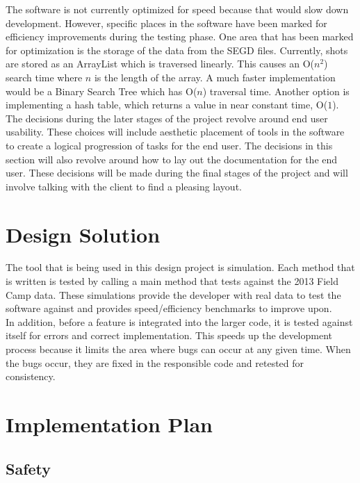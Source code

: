 \documentclass[12pt]{article}
\begin{document}
The software is not currently optimized for speed because that would slow down development. However, specific places in the software have been marked for efficiency improvements during the testing phase. One area that has been marked for optimization is the storage of the data from the SEGD files. Currently, shots are stored as an ArrayList which is traversed linearly. This causes an O($n^2$) search time where $n$ is the length of the array. A much faster implementation would be a Binary Search Tree which has O($n$) traversal time. Another option is implementing a hash table, which returns a value in near constant time, O($1$). \\

The decisions during the later stages of the project revolve around end user usability. These choices will include aesthetic placement of tools in the software to create a logical progression of tasks for the end user. The decisions in this section will also revolve around how to lay out the documentation for the end user. These decisions will be made during the final stages of the project and will involve talking with the client to find a pleasing layout. \\

\section{Design Solution}

The tool that is being used in this design project is simulation. Each method that is written is tested by calling a main method that tests against the 2013 Field Camp data. These simulations provide the developer with real data to test the software against and provides speed/efficiency benchmarks to improve upon. \\

In addition, before a feature is integrated into the larger code, it is tested against itself for errors and correct implementation. This speeds up the development process because it limits the area where bugs can occur at any given time. When the bugs occur, they are fixed in the responsible code and retested for consistency.

\section{Implementation Plan}
\subsection{Safety}
\end{document}
